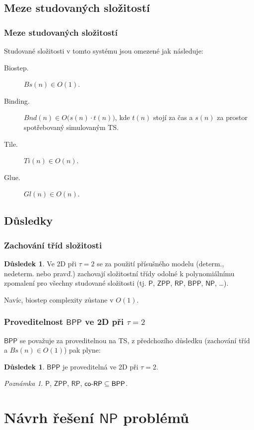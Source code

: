 \documentclass[10pt]{beamer}
\renewcommand{\P}{\mathsf{P}}
\newcommand{\NP}{\mathsf{NP}}
\newcommand{\RP}{\mathsf{RP}}
\newcommand{\coRP}{\mathsf{co}\textnormal{-}\mathsf{RP}}
\newcommand{\BPP}{\mathsf{BPP}}
\newcommand{\ZPP}{\mathsf{ZPP}}
\theoremstyle{definition}
\newtheorem{dusl}[tvr]{Důsledek}
\theoremstyle{remark}
\newtheorem{pozn}{Poznámka}
\begin{document}
\subsection{Meze studovaných složitostí}
\begin{frame}
\frametitle{Meze studovaných složitostí}
	\begin{lemma}
		Studované složitosti v tomto systému jsou omezené jak následuje:
		\begin{description}
			\item[Biostep.] $Bs(n) \in O(1)$.
			\item[Binding.] $Bnd(n) \in O\bigl(s(n)\cdot t(n)\bigr)$, kde $t(n)$ stojí za čas a $s(n)$ za prostor spotřebovaný simulovaným TS.
			\item[Tile.] $Ti(n) \in O(n)$.
			\item[Glue.] $Gl(n) \in O(n)$.
		\end{description}
	\end{lemma}
\end{frame}

\subsection{Důsledky}
\begin{frame}
\frametitle{Zachování tříd složitosti}
	\begin{dusl}
		Ve 2D při $\tau=2$ se za použití přísušného modelu (determ., nedeterm. nebo pravď.) zachovají složitostní třídy odolné k polynomiálnímu zpomalení pro všechny studované složitosti (tj. $\P$, $\ZPP$, $\RP$, $\BPP$, $\NP$, \ldots).
		
		Navíc, biostep complexity zůstane v $O(1)$.
	\end{dusl}
\end{frame}

\begin{frame}
\frametitle{Proveditelnost $\BPP$ ve 2D při $\tau=2$}
	$\BPP$ se považuje za proveditelnou na TS, z předchozího důsledku (zachování tříd a $Bs(n)\in O(1)$) pak plyne:
	\begin{dusl}
		$\BPP$ je proveditelná  ve 2D při $\tau=2$.
	\end{dusl}
	\begin{pozn}
		$\P$, $\ZPP$, $\RP$, $\coRP \subseteq \BPP$.
	\end{pozn}
\end{frame}

\section{Návrh řešení $\NP$ problémů}
\end{document}
